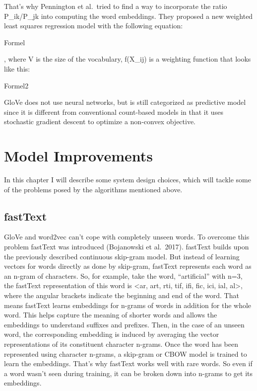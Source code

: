 \documentclass[]{krantz}
\begin{document}
That's why Pennington et al.~tried to find a way to incorporate the ratio P\_ik/P\_jk into computing the word embeddings. They proposed a new weighted least squares regression model with the following equation:

Formel

, where V is the size of the vocabulary, f(X\_ij) is a weighting function that looks like this:

Formel2

GloVe does not use neural networks, but is still categorized as predictive model since it is different from conventional count-based models in that it uses stochastic gradient descent to optimize a non-convex objective.

\hypertarget{model-improvements}{%
\section{Model Improvements}\label{model-improvements}}

In this chapter I will describe some system design choices, which will tackle some of the problems posed by the algorithms mentioned above.

\hypertarget{fasttext}{%
\subsection{fastText}\label{fasttext}}

GloVe and word2vec can't cope with completely unseen words. To overcome this problem fastText was introduced (Bojanowski et al.~2017). fastText builds upon the previously described continuous skip-gram model. But instead of learning vectors for words directly as done by skip-gram, fastText represents each word as an n-gram of characters. So, for example, take the word, ``artificial'' with n=3, the fastText representation of this word is \textless{}ar, art, rti, tif, ifi, fic, ici, ial, al\textgreater{}, where the angular brackets indicate the beginning and end of the word. That means fastText learns embeddings for n-grams of words in addition for the whole word. This helps capture the meaning of shorter words and allows the embeddings to understand suffixes and prefixes. Then, in the case of an unseen word, the corresponding embedding is induced by averaging the vector representations of its constituent character n-grams. Once the word has been represented using character n-grams, a skip-gram or CBOW model is trained to learn the embeddings. That's why fastText works well with rare words. So even if a word wasn't seen during training, it can be broken down into n-grams to get its embeddings.
\end{document}
